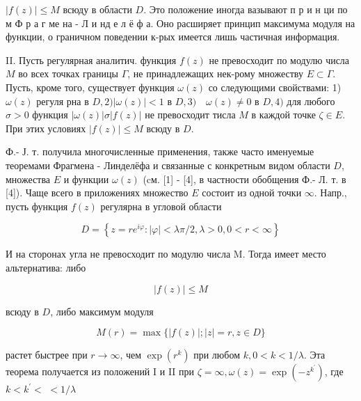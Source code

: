 \documentclass[10pt]{article}
\begin{document}
$|f(z)| \leqslant M$ всюду в области $D$. Это положение иногда вазывают п р и н ци по м Ф р а г ме на - Л и нд е л ё ф а. Оно расширяет принцип максимума модуля на функции, о граничном поведении к-рых имеется лишь частичная информация.



II. Пусть регулярная аналитич. функция $f(z)$ не превосходит по модулю числа $M$ во всех точках границы $\Gamma$, не принадлежащих нек-рому множеству $E \subset \Gamma$. Пусть, кроме того, существует функция $\omega(z)$ со следующими свойствами: 1) $\omega(z)$ регуля рна в $D, 2)|\omega(z)|<1$ в $D, 3) \quad \omega(z) \neq 0$ в $D, 4)$ для любого $\sigma>0$ функция $|\omega(z)| \sigma|f(z)|$ не превосходит тисла $M$ в каждой точке $\zeta \in E$. При этих условиях $|f(z)| \leqslant M$ всюду в $D$.



Ф.- Ј. т. получила многочисленные применения, также часто именуемые теоремами Фрагмена - Линделёфа и связанные с конкретным видом области $D$, множества $E$ и функции $\omega(z)$ (cм. [1] - [4], в частности обобщения Ф.- Л. т. в [4]). Чаще всего в приложениях множество $E$ состоит из одной точки $\infty$. Напр., пусть функция $f(z)$ регулярна в угловой области



\[

D=\left\{z=r e^{i \varphi}:|\varphi|<\lambda \pi / 2, \lambda>0,0<r<\infty\right\}

\]



И на сторонах угла не превосходит по модулю числа M. Тогда имеет место альтернатива: либо



\[

|f(z)| \leqslant M

\]



всюду в $D$, либо максимум модуля



\[

M(r)=\max \{|f(z)| ;|z|=r, z \in D\}

\]



растет быстрее при $r \rightarrow \infty$, чем $\exp \left(r^{k}\right)$ при любом $k, 0<k<1 / \lambda$. Эта теорема получается из положений I и II при $\zeta=\infty, \omega(z)=\exp \left(-z^{k^{\prime}}\right)$, где $k<k^{\prime}<$ $<1 / \lambda$
\end{document}
